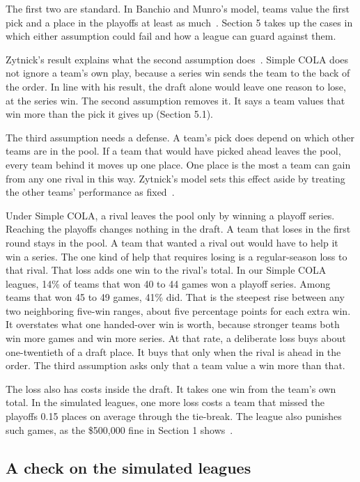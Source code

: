 \documentclass[11pt,letterpaper]{article}
\begin{document}
The first two are standard. In Banchio and Munro's model, teams value the first pick and a place in the playoffs at least as much~\cite{munro2020notanking}. Section 5 takes up the cases in which either assumption could fail and how a league can guard against them.

Zytnick's result explains what the second assumption does~\cite{zytnick2026trade}. Simple COLA does not ignore a team's own play, because a series win sends the team to the back of the order. In line with his result, the draft alone would leave one reason to lose, at the series win. The second assumption removes it. It says a team values that win more than the pick it gives up (Section 5.1).

The third assumption needs a defense. A team's pick does depend on which other teams are in the pool. If a team that would have picked ahead leaves the pool, every team behind it moves up one place. One place is the most a team can gain from any one rival in this way. Zytnick's model sets this effect aside by treating the other teams' performance as fixed~\cite{zytnick2026trade}.

Under Simple COLA, a rival leaves the pool only by winning a playoff series. Reaching the playoffs changes nothing in the draft. A team that loses in the first round stays in the pool. A team that wanted a rival out would have to help it win a series. The one kind of help that requires losing is a regular-season loss to that rival. That loss adds one win to the rival's total. In our Simple COLA leagues, 14\% of teams that won 40 to 44 games won a playoff series. Among teams that won 45 to 49 games, 41\% did. That is the steepest rise between any two neighboring five-win ranges, about five percentage points for each extra win. It overstates what one handed-over win is worth, because stronger teams both win more games and win more series. At that rate, a deliberate loss buys about one-twentieth of a draft place. It buys that only when the rival is ahead in the order. The third assumption asks only that a team value a win more than that.

The loss also has costs inside the draft. It takes one win from the team's own total. In the simulated leagues, one more loss costs a team that missed the playoffs 0.15 places on average through the tie-break. The league also punishes such games, as the \$500,000 fine in Section 1 shows~\cite{nba2026fines}.

\subsection{A check on the simulated leagues}
\end{document}
